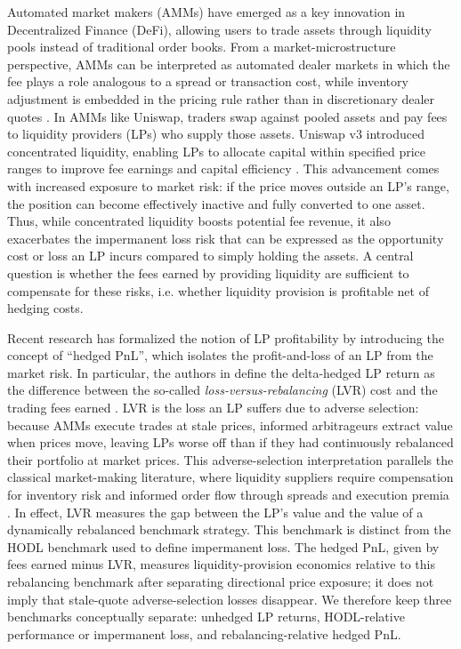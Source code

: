 \documentclass[11pt]{article}
\begin{document}
Automated market makers (AMMs) have emerged as a key innovation in Decentralized Finance (DeFi), allowing users to trade assets 
through liquidity pools instead of traditional order books. From a market-microstructure perspective, AMMs can be interpreted
as automated dealer markets in which the fee plays a role analogous to a spread or transaction cost, while inventory adjustment
is embedded in the pricing rule rather than in discretionary dealer quotes \cite{ho1983,avellaneda2008,angeris2021analysis,CARTEA2025105134}.
In AMMs like Uniswap, traders swap against pooled assets and pay fees to liquidity providers (LPs) who supply those assets.
Uniswap v3 introduced concentrated liquidity, enabling LPs
to allocate capital within specified price ranges to improve fee earnings and capital efficiency \cite{adams2021}. This 
advancement comes with increased exposure to market risk: if the price moves outside an LP’s range, the position can 
become effectively inactive and fully converted to one asset. Thus, while concentrated liquidity boosts potential fee 
revenue, it also exacerbates the impermanent loss risk that can be expressed as the opportunity cost or loss an LP 
incurs compared to simply holding the assets. A central question is whether the fees earned by providing liquidity 
are sufficient to compensate for these risks, i.e. whether liquidity provision is profitable net of hedging costs.

Recent research \cite{milionis2023} has formalized the notion of LP profitability by introducing the concept of “hedged 
PnL”, which isolates the profit-and-loss of an LP from the market risk. In particular, the authors in\cite{milionis2023} define the 
delta-hedged LP return as the difference between the so-called \textit{loss-versus-rebalancing} (LVR) cost and the trading 
fees earned \cite{milionis2023}. LVR is the loss an LP suffers due to adverse selection: because AMMs execute trades at 
stale prices, informed arbitrageurs extract value when prices move, leaving LPs worse off than if they had continuously 
rebalanced their portfolio at market prices. This adverse-selection interpretation parallels the classical market-making
literature, where liquidity suppliers require compensation for inventory risk and informed order flow through spreads and
execution premia \cite{ho1983,avellaneda2008,cartea2015book,gueant2016book}. In effect, LVR measures the gap between the LP's value and the value of a dynamically rebalanced benchmark strategy. This benchmark is distinct from the HODL benchmark used to define impermanent loss. The hedged PnL, given by fees earned minus LVR, measures liquidity-provision economics relative to this rebalancing benchmark after separating directional price exposure; it does not imply that stale-quote adverse-selection losses disappear. We therefore keep three benchmarks conceptually separate: unhedged LP returns, HODL-relative performance or impermanent loss, and rebalancing-relative hedged PnL.
\end{document}
